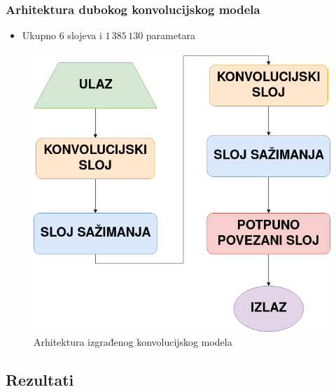 \documentclass{beamer}
\begin{document}
\begin{frame}
	\frametitle{Arhitektura dubokog konvolucijskog modela}
	\begin{itemize}
		\item Ukupno 6 slojeva i $1\,385\,130$ parametara 
	\end{itemize}

	\begin{figure}[h]
		\centering
		\includegraphics[scale=0.24]{arhitektura_neuronske.png}
		\caption{Arhitektura izgrađenog konvolucijskog modela}
	\end{figure}
\end{frame}
\subsection{Rezultati}
\end{document}
